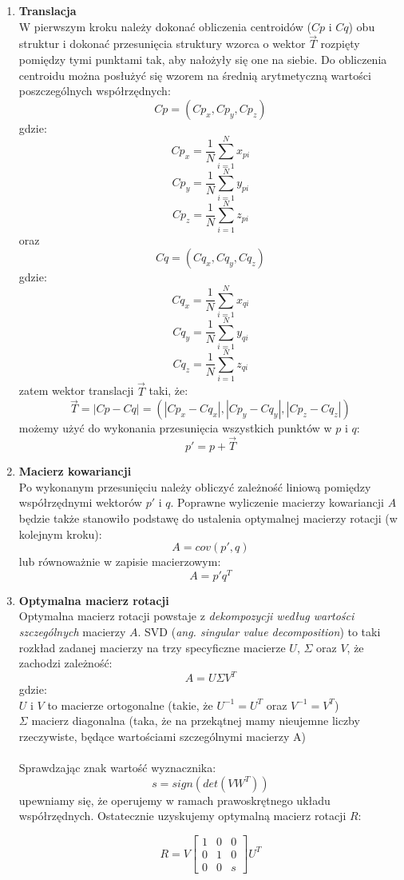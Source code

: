 \documentclass[licencjacka]{pracamgr}
\begin{document}
\begin{enumerate}
\item \textbf{Translacja} \\
W pierwszym kroku należy dokonać obliczenia centroidów ($Cp$ i $Cq$) obu struktur i dokonać przesunięcia struktury wzorca o wektor $\vec{T}$ rozpięty pomiędzy tymi punktami tak, aby nałożyły się one na siebie. Do obliczenia centroidu można posłużyć się wzorem na średnią arytmetyczną wartości poszczególnych współrzędnych: 
$$Cp = (Cp_x, Cp_y, Cp_z)$$
gdzie:
$$Cp_x = \frac{1}{N}\sum_{i=1}^{N}{x_{pi}}$$
$$Cp_y = \frac{1}{N}\sum_{i=1}^{N}{y_{pi}}$$
$$Cp_z = \frac{1}{N}\sum_{i=1}^{N}{z_{pi}}$$
oraz
$$Cq = (Cq_x, Cq_y, Cq_z)$$
gdzie:
$$Cq_x = \frac{1}{N}\sum_{i=1}^{N}{x_{qi}}$$
$$Cq_y = \frac{1}{N}\sum_{i=1}^{N}{y_{qi}}$$
$$Cq_z = \frac{1}{N}\sum_{i=1}^{N}{z_{qi}}$$
zatem wektor translacji $\vec{T}$ taki, że:
$$ \vec{T} = |Cp-Cq| =(|Cp_x-Cq_x|,|Cp_y-Cq_y|,|Cp_z-Cq_z|)$$
możemy użyć do wykonania przesunięcia wszystkich punktów w $p$ i $q$:
$$p'=p+\vec{T}$$
\item \textbf{Macierz kowariancji} \\
Po wykonanym przesunięciu należy obliczyć zależność liniową pomiędzy współrzędnymi wektorów $p'$ i $q$. Poprawne wyliczenie macierzy kowariancji $A$ będzie także stanowiło podstawę do ustalenia optymalnej macierzy rotacji (w kolejnym kroku):
$$ 
A=cov(p',q)
$$
lub równoważnie w zapisie macierzowym:
$$
 A = p'q^T
$$

\item \textbf{Optymalna macierz rotacji} \\
Optymalna macierz rotacji powstaje z \textit{dekompozycji według wartości szczególnych} macierzy $A$. SVD (\textit{ang. singular value decomposition}) to taki rozkład zadanej macierzy na trzy specyficzne macierze $U$, $\Sigma$ oraz $V$, że zachodzi zależność:
$$
A=U \Sigma V^T
$$
gdzie:
\\
$U$ i $V$ to macierze ortogonalne (takie, że $U^{-1}=U^{T}$ oraz $V^{-1}=V^{T}$)
\\
$\Sigma$ macierz diagonalna (taka, że na przekątnej mamy nieujemne liczby rzeczywiste, będące wartościami szczególnymi macierzy A)
\\
\\
Sprawdzając znak wartość wyznacznika:
$$
s=sign(det(VW^T))
$$
upewniamy się, że operujemy w ramach prawoskrętnego układu współrzędnych. Ostatecznie uzyskujemy optymalną macierz rotacji $R$:

$$
R=V
\begin{bmatrix}
 1 & 0 & 0 \\
 0 & 1 & 0 \\
 0 & 0 & s
\end{bmatrix}
U^T
$$

\end{enumerate}
\end{document}
